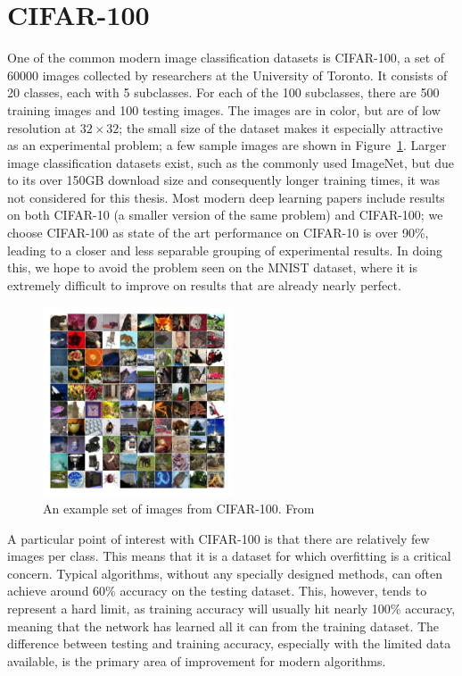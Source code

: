 \section{CIFAR-100}
One of the common modern image classification datasets is CIFAR-100, a set of 60000 images collected by researchers at the University of Toronto.
It consists of 20 classes, each with 5 subclasses.
For each of the 100 subclasses, there are 500 training images and 100 testing images.
The images are in color, but are of low resolution at $32\times 32$; the small size of the dataset makes it especially attractive as an experimental problem; a few sample images are shown in Figure~\ref{fig:cifar100}.
Larger image classification datasets exist, such as the commonly used ImageNet, but due to its over 150GB download size and consequently longer training times, it was not considered for this thesis.
Most modern deep learning papers include results on both CIFAR-10 (a smaller version of the same problem) and CIFAR-100; we choose CIFAR-100 as state of the art performance on CIFAR-10 is over 90\%, leading to a closer and less separable grouping of experimental results.
In doing this, we hope to avoid the problem seen on the MNIST dataset, where it is extremely difficult to improve on results that are already nearly perfect.

\begin{figure}[!htb]
\centering
\includegraphics[width=0.5\textwidth]{images/cifar100}
\caption{An example set of images from CIFAR-100. From \cite{cifar100-sample}}
\label{fig:cifar100}
\end{figure}

A particular point of interest with CIFAR-100 is that there are relatively few images per class.
This means that it is a dataset for which overfitting is a critical concern.
Typical algorithms, without any specially designed methods, can often achieve around 60\% accuracy on the testing dataset.
This, however, tends to represent a hard limit, as training accuracy will usually hit nearly 100\% accuracy, meaning that the network has learned all it can from the training dataset.
The difference between testing and training accuracy, especially with the limited data available, is the primary area of improvement for modern algorithms.

